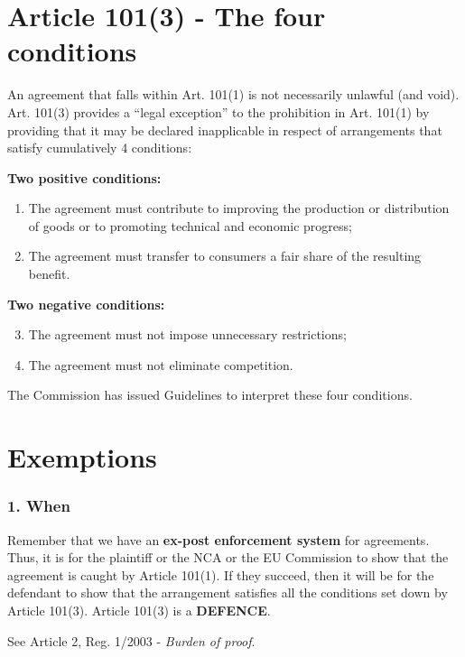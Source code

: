 \section{Article 101(3) - The four conditions }

    An agreement that falls within Art. 101(1) is not necessarily unlawful (and void). Art. 101(3) provides a “legal exception” to the prohibition in Art. 101(1) by providing that it may be declared inapplicable in respect of arrangements that satisfy cumulatively 4 conditions:

    \textbf{Two positive conditions:}
    \begin{enumerate}[label=\arabic*.]
        \item The agreement must contribute to improving the production or distribution of goods or to promoting technical and economic progress;
        \item The agreement must transfer to consumers a fair share of the resulting benefit.
    \end{enumerate}
    
    \textbf{Two negative conditions:}
    \begin{enumerate}[label=\arabic*.]
        \setcounter{enumi}{2}
        \item The agreement must not impose unnecessary restrictions;
        \item The agreement must not eliminate competition.
    \end{enumerate}
    
    The Commission has issued Guidelines to interpret these four conditions.
    
\section{Exemptions}

        \subsubsection{1. When}

            Remember that we have an \textbf{ex-post enforcement system} for agreements. Thus, it is for the plaintiff or the NCA or the EU Commission to show that the agreement is caught by Article 101(1). If they succeed, then it will be for the defendant to show that the arrangement satisfies all the conditions set down by Article 101(3). Article 101(3) is a \textbf{DEFENCE}.

            See Article 2, Reg. 1/2003 - \textit{Burden of proof}.
            
